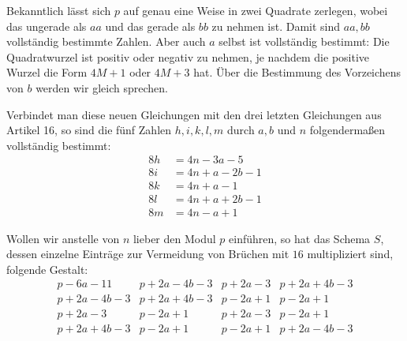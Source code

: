 Bekanntlich lässt sich $p$ auf genau eine Weise in zwei Quadrate zerlegen, wobei das ungerade als $aa$ und das gerade als $bb$ zu nehmen ist. Damit sind $aa,bb$ vollständig bestimmte Zahlen. Aber auch $a$ selbst ist vollständig bestimmt: Die Quadratwurzel ist positiv oder negativ zu nehmen, je nachdem die positive Wurzel die Form $4M+1$ oder $4M+3$ hat. Über die Bestimmung des Vorzeichens von $b$ werden wir gleich sprechen.

Verbindet man diese neuen Gleichungen mit den drei letzten Gleichungen aus Artikel 16, so sind die fünf Zahlen $h,i,k,l,m$ durch $a,b$ und $n$ folgendermaßen vollständig bestimmt:
%
\[
\begin{aligned}
8h&=4n-3a-5\\
8i&=4n+a-2b-1\\
8k&=4n+a-1\\
8l&=4n+a+2b-1\\
8m&=4n-a+1
\end{aligned}
\]

Wollen wir anstelle von $n$ lieber den Modul $p$ einführen, so hat das Schema $S$, dessen einzelne Einträge zur Vermeidung von Brüchen mit $16$ multipliziert sind, folgende Gestalt:
\[
\begin{array}{l|l|l|l}
p-6a-11&p+2a-4b-3&p+2a-3&p+2a+4b-3\\
p+2a-4b-3&p+2a+4b-3&p-2a+1&p-2a+1\\
p+2a-3&p-2a+1&p+2a-3&p-2a+1\\
p+2a+4b-3&p-2a+1&p-2a+1&p+2a-4b-3
\end{array}
\]

